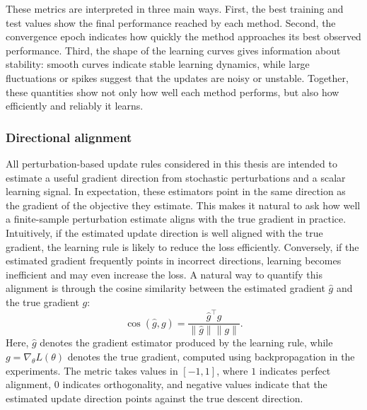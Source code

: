 These metrics are interpreted in three main ways. First, the best training and test values show the final performance reached by each method. Second, the convergence epoch indicates how quickly the method approaches its best observed performance. Third, the shape of the learning curves gives information about stability: smooth curves indicate stable learning dynamics, while large fluctuations or spikes suggest that the updates are noisy or unstable. Together, these quantities show not only how well each method performs, but also how efficiently and reliably it learns.

\subsubsection{Directional alignment}

All perturbation-based update rules considered in this thesis are intended to estimate a useful gradient direction from stochastic perturbations and a scalar learning signal. In expectation, these estimators point in the same direction as the gradient of the objective they estimate. This makes it natural to ask how well a finite-sample perturbation estimate aligns with the true gradient in practice. Intuitively, if the estimated update direction is well aligned with the true gradient, the learning rule is likely to reduce the loss efficiently. Conversely, if the estimated gradient frequently points in incorrect directions, learning becomes inefficient and may even increase the loss. A natural way to quantify this alignment is through the cosine similarity between the estimated gradient \(\widehat{g}\) and the true gradient \(g\):
\[
\cos(\widehat{g}, g)
=
\frac{\widehat{g}^{\top}g}{\|\widehat{g}\|\|g\|}.
\]
Here, \(\widehat{g}\) denotes the gradient estimator produced by the learning rule, while \(g=\nabla_\theta L(\theta)\) denotes the true gradient, computed using backpropagation in the experiments. The metric takes values in \([-1,1]\), where \(1\) indicates perfect alignment, \(0\) indicates orthogonality, and negative values indicate that the estimated update direction points against the true descent direction.

